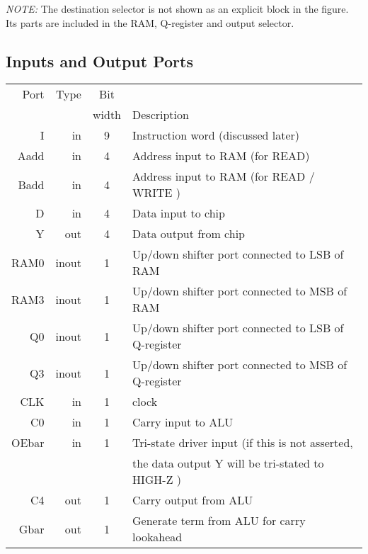 {\em NOTE:} The destination selector is not shown as an explicit block in the
figure. Its parts are included in the RAM, Q-register and output selector.

\subsection*{Inputs and Output Ports}

\begin{center}
\begin{tabular}{|r|r|c|l|} \hline
  Port & Type  &Bit  &                                                       \\
       &       &width&      Description                                       \\ \hline
     I &    in & 9   & Instruction word (discussed later)                     \\ \hline
  Aadd &    in & 4   & Address input to RAM (for READ)                       \\ \hline
  Badd &    in & 4   & Address input to RAM (for READ / WRITE )              \\ \hline
     D &    in & 4   & Data input to chip                                     \\ \hline
     Y &   out & 4   & Data output from chip                                  \\ \hline
  RAM0 & inout & 1   & Up/down shifter port connected to LSB of RAM           \\ \hline
  RAM3 & inout & 1   & Up/down shifter port connected to MSB of RAM           \\ \hline
    Q0 & inout & 1   & Up/down shifter port connected to LSB of Q-register    \\ \hline
    Q3 & inout & 1   & Up/down shifter port connected to MSB of Q-register    \\ \hline
   CLK &    in & 1   & clock                                                  \\ \hline
    C0 &    in & 1   & Carry input to ALU                                     \\ \hline
 OEbar &    in & 1   & Tri-state driver input (if this is not asserted,      \\
       &       &     &   the data output Y will be tri-stated to HIGH-Z )     \\ \hline
    C4 &   out & 1   & Carry output from ALU                                  \\ \hline
  Gbar &   out & 1   & Generate term from ALU for carry lookahead             \\ \hline

\end{tabular}
\end{center}
